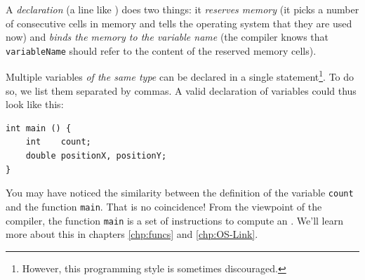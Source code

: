 A \emph{declaration} (\ie a line like ) does two things: it \emph{reserves memory} (\ie it picks a number of consecutive cells in memory and tells the operating system that they are used now) and \emph{binds the memory to the variable name} (\ie the compiler knows that \texttt{variableName} should refer to the content of the reserved memory cells).

Multiple variables \emph{of the same type} can be declared in a single statement\footnote{However, this programming style is sometimes discouraged.}. To do so, we list them separated by commas. A valid declaration of variables could thus look like this:
\begin{codebox}[declarations.c]
\begin{verbatim}
int main () {
    int    count;
    double positionX, positionY;
}
\end{verbatim}
 \label{code:declaringVars}
\end{codebox}

You may have noticed the similarity between the definition of the variable \texttt{count} and the function \texttt{main}. That is no coincidence! From the viewpoint of the compiler, the function \texttt{main} is a set of instructions to compute an . We'll learn more about this in chapters \ref{chp:funcs} and \ref{chp:OS-Link}.

